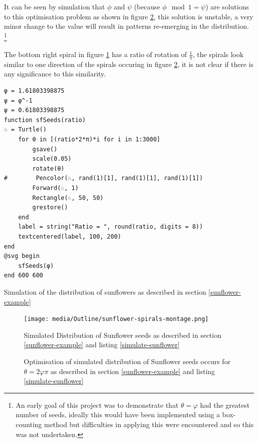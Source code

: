 \documentclass[a4paper,11pt,twoside]{article}
\begin{document}
It can be seen by simulation that \(\phi\) and \(\psi\) (because \(\phi \mod 1 =
\psi\)) are solutions to this optimisation problem as shown in figure
\ref{simulate-sunflower-phi}, this solution is unstable, a very minor change to the
value will result in patterns re-emerging in the distribution. \footnote{An early goal of this project was to demonstrate that \(\theta = \varphi\) had the greatest number of seeds, ideally this would have been implemented using a box-counting method but difficulties in applying this were encountered and so this was not undertaken.}

The bottom right spiral in figure \ref{simulate-sunflower-image} has a ratio of rotation of \(\frac{1}{\pi}\), the spirals look similar to one direction of the spirals occuring in figure \ref{simulate-sunflower-phi}, it is not clear if there is any significance to this similarity.

\begin{listing}[htbp]
\begin{verbatim}
φ = 1.61803398875
ψ = φ^-1
ψ = 0.61803398875
function sfSeeds(ratio)
♘ = Turtle()
    for θ in [(ratio*2*π)*i for i in 1:3000]
        gsave()
        scale(0.05)
        rotate(θ)
#        Pencolor(♘, rand(1)[1], rand(1)[1], rand(1)[1])
        Forward(♘, 1)
        Rectangle(♘, 50, 50)
        grestore()
    end
    label = string("Ratio = ", round(ratio, digits = 8))
    textcentered(label, 100, 200)
end
@svg begin
    sfSeeds(φ)
end 600 600
\end{verbatim}
\caption{\label{simulate-sunflower}Simulation of the distribution of sunflowers as described in section \ref{sunflower-example}}
\end{listing}

\begin{figure}[htbp]
\centering
\texttt{[image: media/Outline/sunflower-spirals-montage.png]}
\caption{\label{simulate-sunflower-image}Simulated Distribution of Sunflower seeds as described in section \ref{sunflower-example} and listing \ref{simulate-sunflower}}
\end{figure}

\begin{figure}[htbp]
\centering

\caption{\label{simulate-sunflower-phi}Optimisation of simulated distribution of Sunflower seeds occurs for \(\theta =2 \varphi  \pi\) as described in section \ref{sunflower-example} and listing \ref{simulate-sunflower}}
\end{figure}
\end{document}
